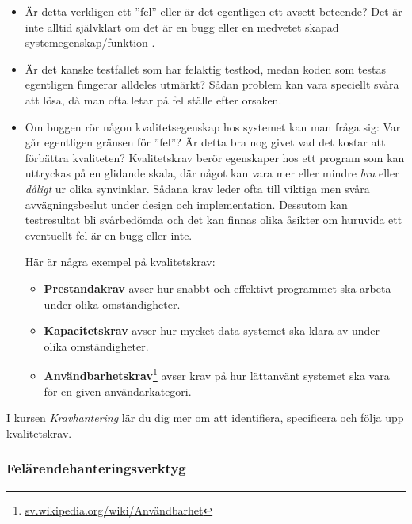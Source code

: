 \begin{itemize}
\item Är detta verkligen ett ''fel'' eller är det egentligen ett avsett beteende? Det är inte alltid självklart om det är en bugg eller en medvetet skapad systemegenskap/funktion .

\item Är det kanske testfallet som har felaktig testkod, medan koden som testas egentligen fungerar alldeles utmärkt? Sådan problem kan vara speciellt svåra att lösa, då man ofta letar på fel ställe efter orsaken.

\item Om buggen rör någon kvalitetsegenskap hos systemet kan man fråga sig: Var går egentligen gränsen för ''fel''? Är detta bra nog givet vad det kostar att förbättra kvaliteten? Kvalitetskrav berör egenskaper hos ett program som kan uttryckas på en glidande skala, där något kan vara mer eller mindre \emph{bra} eller \emph{dåligt} ur olika synvinklar. Sådana krav leder ofta till viktiga men svåra avvägningsbeslut under design och implementation. Dessutom kan testresultat bli svårbedömda och det kan finnas olika åsikter om huruvida ett eventuellt fel är en bugg eller inte.

Här är några exempel på kvalitetskrav:
\begin{itemize}
\item \textbf{Prestandakrav}  avser hur snabbt och effektivt programmet ska arbeta under olika omständigheter.
 
\item \textbf{Kapacitetskrav}  avser hur mycket data systemet ska klara av under olika omständigheter.

\item \textbf{Användbarhetskrav}\footnote{\href{https://sv.wikipedia.org/wiki/Anv\%C3\%A4ndbarhet}{sv.wikipedia.org/wiki/Användbarhet}}  avser krav på hur lättanvänt systemet ska vara för en given användarkategori. 
\end{itemize} 

\end{itemize}

I kursen \textit{Kravhantering}  lär du dig mer om att identifiera, specificera och följa upp kvalitetskrav.

\subsubsection{Felärendehanteringsverktyg} 

